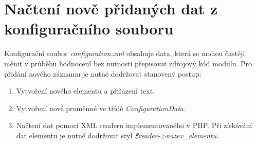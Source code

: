 \section{Načtení nově přidaných dat z konfiguračního souboru}
Konfigurační soubor \textit{configuration.xml} obsahuje data, která se mohou častěji měnit v průběhu hodnocení bez nutnosti přepisovat zdrojový kód modulu. Pro přidání nového záznamu je nutné dodržovat stanovený postup:
\begin{enumerate}
	\item Vytvoření nového elementu a přiřazení text.
	\item Vytvoření nové proměnné ve třídě \textit{ConfigurationData}.
	\item Načtení dat pomocí XML readeru implementovaného v PHP. Při získávání dat elementu je nutné dodržovat styl \textit{\$reader->nazev\_elementu}. 
\end{enumerate}